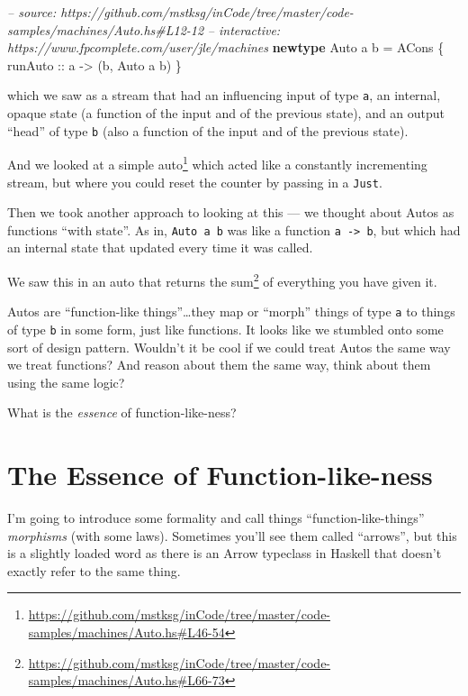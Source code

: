 \documentclass[]{article}
\newenvironment{Shaded}{}{}
\newcommand{\KeywordTok}[1]{\textcolor[rgb]{0.00,0.44,0.13}{\textbf{{#1}}}}
\newcommand{\DataTypeTok}[1]{\textcolor[rgb]{0.56,0.13,0.00}{{#1}}}
\newcommand{\CommentTok}[1]{\textcolor[rgb]{0.38,0.63,0.69}{\textit{{#1}}}}
\newcommand{\OtherTok}[1]{\textcolor[rgb]{0.00,0.44,0.13}{{#1}}}
\newcommand{\FunctionTok}[1]{\textcolor[rgb]{0.02,0.16,0.49}{{#1}}}
\newcommand{\NormalTok}[1]{{#1}}
\renewcommand{\href}[2]{#2\footnote{\url{#1}}}
\begin{document}
\begin{Shaded}
\begin{Highlighting}[]
\CommentTok{-- source: https://github.com/mstksg/inCode/tree/master/code-samples/machines/Auto.hs#L12-12}
\CommentTok{-- interactive: https://www.fpcomplete.com/user/jle/machines}
\KeywordTok{newtype} \DataTypeTok{Auto} \NormalTok{a b }\FunctionTok{=} \DataTypeTok{ACons} \NormalTok{\{}\OtherTok{ runAuto ::} \NormalTok{a }\OtherTok{->} \NormalTok{(b, }\DataTypeTok{Auto} \NormalTok{a b) \}}
\end{Highlighting}
\end{Shaded}

which we saw as a stream that had an influencing input of type
\texttt{a}, an internal, opaque state (a function of the input and of
the previous state), and an output ``head'' of type \texttt{b} (also a
function of the input and of the previous state).

And we looked at
\href{https://github.com/mstksg/inCode/tree/master/code-samples/machines/Auto.hs\#L46-54}{a
simple auto} which acted like a constantly incrementing stream, but
where you could reset the counter by passing in a \texttt{Just}.

Then we took another approach to looking at this --- we thought about
Autos as functions ``with state''. As in, \texttt{Auto\ a\ b} was like a
function \texttt{a\ -\textgreater{}\ b}, but which had an internal state
that updated every time it was called.

We saw this in an auto that
\href{https://github.com/mstksg/inCode/tree/master/code-samples/machines/Auto.hs\#L66-73}{returns
the sum} of everything you have given it.

Autos are ``function-like things''\ldots{}they map or ``morph'' things
of type \texttt{a} to things of type \texttt{b} in some form, just like
functions. It looks like we stumbled onto some sort of design pattern.
Wouldn't it be cool if we could treat Autos the same way we treat
functions? And reason about them the same way, think about them using
the same logic?

What is the \emph{essence} of function-like-ness?

\section{The Essence of
Function-like-ness}\label{the-essence-of-function-like-ness}

I'm going to introduce some formality and call things
``function-like-things'' \emph{morphisms} (with some laws). Sometimes
you'll see them called ``arrows'', but this is a slightly loaded word as
there is an Arrow typeclass in Haskell that doesn't exactly refer to the
same thing.
\end{document}
